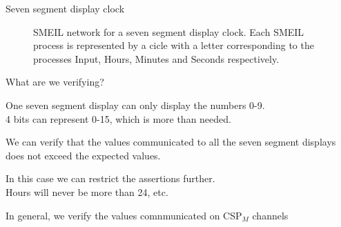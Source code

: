 \documentclass[13pt]{beamer}
\newcommand{\cspm}{CSP$_M$}
\begin{document}
\begin{frame}{Seven segment display clock}
 \begin{block}{}
  \begin{figure}[!ht]
  \centering
  \caption{SMEIL network for a seven segment display clock. Each SMEIL process is represented by a cicle with a letter corresponding to the processes Input, Hours, Minutes and Seconds respectively.}
  \label{fig:smeil_network}
\end{figure}
 \end{block}
\end{frame}

\begin{frame}{What are we verifying?}
 \begin{block}{}
   One seven segment display can only display the numbers 0-9. \\
   4 bits can represent 0-15, which is more than needed.
 \end{block}

 \pause

 \begin{block}{}
   We can verify that the values communicated to all the seven segment displays does not exceed the expected values.
 \end{block}

  \pause

  \begin{block}{}
    In this case we can restrict the assertions further. \\
    Hours will never be more than 24, etc.
  \end{block}


 \pause

 \begin{block}{}
   In general, we verify the values comnmunicated on \cspm{} channels
 \end{block}
\end{frame}
\end{document}
